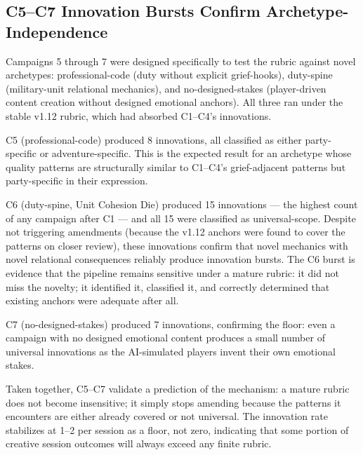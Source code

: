 \subsection{C5--C7 Innovation Bursts Confirm Archetype-Independence}

Campaigns 5 through 7 were designed specifically to test the rubric against novel
archetypes: professional-code (duty without explicit grief-hooks), duty-spine
(military-unit relational mechanics), and no-designed-stakes (player-driven content
creation without designed emotional anchors). All three ran under the stable v1.12
rubric, which had absorbed C1--C4's innovations.

C5 (professional-code) produced 8 innovations, all classified as either
party-specific or adventure-specific. This is the expected result for an archetype
whose quality patterns are structurally similar to C1--C4's grief-adjacent patterns
but party-specific in their expression.

C6 (duty-spine, Unit Cohesion Die) produced 15 innovations --- the highest count
of any campaign after C1 --- and all 15 were classified as universal-scope. Despite
not triggering amendments (because the v1.12 anchors were found to cover the
patterns on closer review), these innovations confirm that novel mechanics with
novel relational consequences reliably produce innovation bursts. The C6 burst
is evidence that the pipeline remains sensitive under a mature rubric: it did
not miss the novelty; it identified it, classified it, and correctly determined
that existing anchors were adequate after all.

C7 (no-designed-stakes) produced 7 innovations, confirming the floor: even a
campaign with no designed emotional content produces a small number of universal
innovations as the AI-simulated players invent their own emotional stakes.

Taken together, C5--C7 validate a prediction of the mechanism: a mature rubric
does not become insensitive; it simply stops amending because the patterns it
encounters are either already covered or not universal. The innovation rate
stabilizes at 1--2 per session as a floor, not zero, indicating that some
portion of creative session outcomes will always exceed any finite rubric.
